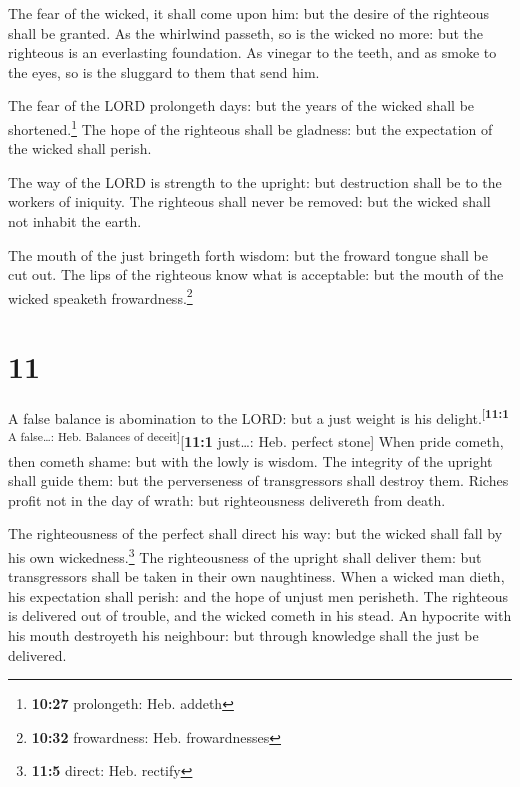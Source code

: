  The fear of the wicked, it shall come upon him: but the
desire of the righteous shall be granted.  As the
whirlwind passeth, so is the wicked no more: but the righteous is an
everlasting foundation.  As vinegar to the teeth, and as
smoke to the eyes, so is the sluggard to them that send him.

 The fear of the LORD prolongeth days: but the years of
the wicked shall be shortened.\footnote{\textbf{10:27} prolongeth: Heb.
  addeth}  The hope of the righteous shall be gladness:
but the expectation of the wicked shall perish.

 The way of the LORD is strength to the upright: but
destruction shall be to the workers of iniquity.  The
righteous shall never be removed: but the wicked shall not inhabit the
earth.

 The mouth of the just bringeth forth wisdom: but the
froward tongue shall be cut out.  The lips of the
righteous know what is acceptable: but the mouth of the wicked speaketh
frowardness.\footnote{\textbf{10:32} frowardness: Heb. frowardnesses}

\hypertarget{section-10}{%
\section{11}\label{section-10}}

 A false balance is abomination to the LORD: but a just
weight is his delight.\textsuperscript{{[}\textbf{11:1} A false\ldots:
Heb. Balances of deceit{]}}{[}\textbf{11:1} just\ldots: Heb. perfect
stone{]}  When pride cometh, then cometh shame: but with
the lowly is wisdom.  The integrity of the upright shall
guide them: but the perverseness of transgressors shall destroy them.
 Riches profit not in the day of wrath: but righteousness
delivereth from death.

 The righteousness of the perfect shall direct his way:
but the wicked shall fall by his own wickedness.\footnote{\textbf{11:5}
  direct: Heb. rectify}  The righteousness of the upright
shall deliver them: but transgressors shall be taken in their own
naughtiness.  When a wicked man dieth, his expectation
shall perish: and the hope of unjust men perisheth.  The
righteous is delivered out of trouble, and the wicked cometh in his
stead.  An hypocrite with his mouth destroyeth his
neighbour: but through knowledge shall the just be delivered.

